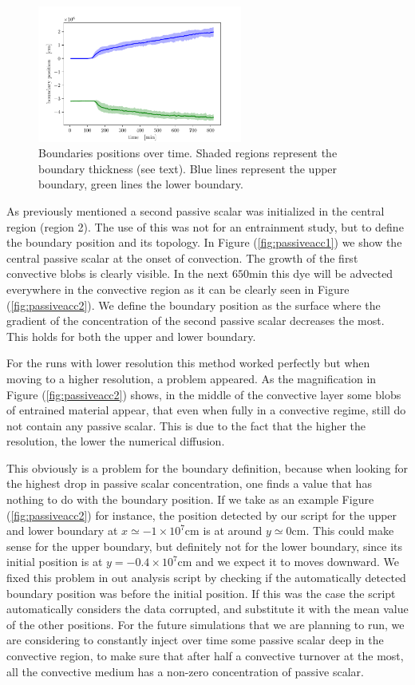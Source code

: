 \begin{figure}[t!]
\centering
\includegraphics[width=0.6\textwidth]{./img/boundpos.pdf}
\caption{Boundaries positions over time. Shaded regions represent the boundary thickness (see text). Blue lines represent the upper boundary, green lines the lower boundary.}
\label{fig:boundpos}
\end{figure}
  As previously mentioned a second passive scalar was initialized in the central region (region 2). The use of this was not for an entrainment study, but to define the boundary position and its topology. In Figure (\ref{fig:passiveacc1}) we show the central passive scalar at the onset of convection. The growth of the first convective blobs is clearly visible. In the next $650 \mathrm{min}$ this dye will be advected everywhere in the convective region as it can be clearly seen in Figure (\ref{fig:passiveacc2}). We define the boundary position as the surface where the gradient of the concentration of the second passive scalar decreases the most. This holds for both the upper and lower boundary.
  
  For the runs with lower resolution this method worked perfectly but when moving to a higher resolution, a problem appeared. As the magnification in Figure (\ref{fig:passiveacc2}) shows, in the middle of the convective layer some blobs of entrained material appear, that even when fully in a convective regime, still do not contain any passive scalar. This is due to the fact that the higher the resolution, the lower the numerical diffusion.
  
  This obviously is a problem for the boundary definition, because when looking for the highest drop in passive scalar concentration, one finds a value that has nothing to do with the boundary position. If we take as an example Figure (\ref{fig:passiveacc2}) for instance, the position detected by our script for the upper and lower boundary at $x \simeq -1 \times 10^{7} \mathrm{cm}$ is at around $y \simeq 0 \mathrm{cm}$. This could make sense for the upper boundary, but definitely not for the lower boundary, since its initial position is at $y=-0.4 \times 10^{7} \mathrm{cm}$ and we expect it to moves downward. We fixed this problem in out analysis script by checking if the automatically detected boundary position was before the initial position. If this was the case the script automatically considers the data corrupted, and substitute it with the mean value of the other positions. For the future simulations that we are planning to run, we are considering to constantly inject over time some passive scalar deep in the convective region, to make sure that after half a convective turnover at the most, all the convective medium has a non-zero concentration of passive scalar.

